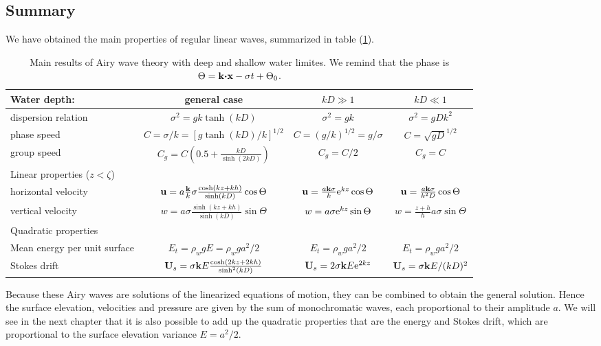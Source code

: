 \subsection{Summary}
We have obtained the main properties of regular linear waves,  summarized in table 
(\ref{table_theory}). 
\begin{table}[htb]
  \centering
  \begin{tabular}{lccc}
\hline
  Water depth: & general case       & $kD \gg 1$  & $kD \ll 1$  \\
\hline
  dispersion relation  &   $\sigma^2=g k \tanh (kD)  $               & $ \sigma^2=g k$ & $\sigma^2=g D k^2 $ \\
  phase speed & $C= {\sigma}/{k}=\left[g  \tanh (kD)/ k\right]^{1/2}$         & $C=\left(g / k\right)^{1/2} ={g}/{\sigma}  $   & $ C = \sqrt{gD}^{1/2}$ \\
  group speed  &  $C_g=C \left(0.5+\frac{kD}{\sinh(2kD)}\right)  $               & $C_g=C/2 $&
  $C_g=C$\\
\hline
  Linear properties  ($z<\zeta$) &    &  & \\
\hline
  horizontal velocity & $\mathbf{u} =   a \frac{{\mathbf k}}{k}\sigma
    \frac{\cosh\left(kz+kh\right)}{\sinh\left(kD\right)}
    \cos \Theta $         &  $\mathbf{u}=\frac{a \mathbf{k} \sigma}{k} \mathrm{e}^{kz}    \cos \Theta$ & $\mathbf{u}=\frac{a \mathbf{k} \sigma}{k^2 D}
        \cos \Theta $\\
  vertical velocity & $w =   a \sigma
    \frac{\sinh\left(kz+kh\right)}{\sinh\left(kD\right)}
    \sin \Theta $         &  $w =a \sigma \mathrm{e}^{kz}    \sin \Theta$ & $w=\frac{z+h}{h}{a \sigma} \sin \Theta $\\
\hline
  Quadratic properties &    &  & \\
\hline
 Mean energy per unit surface & $E_t =  \rho_w g E = \rho_w g a^2 /2$  & $E_t =  \rho_w g  a^2 /2$ & $E_t =  \rho_w g  a^2 /2$ \\
 Stokes drift & ${\mathbf U}_s=\sigma \mathbf{k} E \frac{\cosh(2kz+2kh)}{\sinh^2(kD)}$  & ${\mathbf U}_s=2 \sigma \mathbf{k} E \mathrm{e}^{2kz} $ & ${\mathbf U}_s=\sigma \mathbf{k} E /(kD)^2$ \\
\hline
\end{tabular}
  \caption{Main results of Airy wave theory with deep and shallow water limites.  We remind that the phase is  $\Theta={\mathbf
k}\mbox{\boldmath $\cdot$}{\mathbf x}-\sigma t+ \Theta_0$.
}\label{table_theory}
\end{table}

Because these Airy waves are solutions of the linearized equations of motion, 
they can be combined to obtain the general solution. Hence the surface elevation, velocities and pressure 
are given by the sum of monochromatic waves, each proportional to their amplitude $a$. We will see in the next chapter that it is also possible to add up the quadratic properties 
that are the energy and Stokes drift, which are  proportional to the surface elevation variance
$E=a^2/2$.


